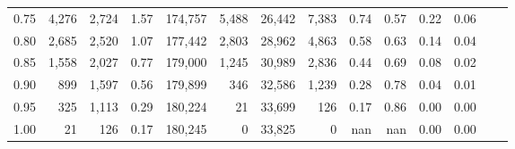 \begin{tabular}{rrrrrrrrrrrrrr}
0.75 &   4,276 &  2,724 &    1.57 &  174,757 &    5,488 &  26,442 &   7,383 &  0.74 &  0.57 &  0.22 &      0.06 \\
0.80 &   2,685 &  2,520 &    1.07 &  177,442 &    2,803 &  28,962 &   4,863 &  0.58 &  0.63 &  0.14 &      0.04 \\
0.85 &   1,558 &  2,027 &    0.77 &  179,000 &    1,245 &  30,989 &   2,836 &  0.44 &  0.69 &  0.08 &      0.02 \\
0.90 &     899 &  1,597 &    0.56 &  179,899 &      346 &  32,586 &   1,239 &  0.28 &  0.78 &  0.04 &      0.01 \\
0.95 &     325 &  1,113 &    0.29 &  180,224 &       21 &  33,699 &     126 &  0.17 &  0.86 &  0.00 &      0.00 \\
1.00 &      21 &    126 &    0.17 &  180,245 &        0 &  33,825 &       0 &   nan &   nan &  0.00 &      0.00 \\
\bottomrule
\end{tabular}
